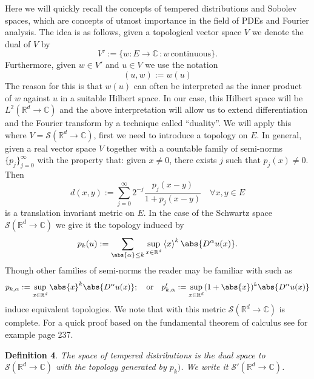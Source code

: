 \documentclass[
]{article}
\begin{document}
Here we will quickly recall the concepts of tempered distributions and
Sobolev spaces, which are concepts of utmost importance in the field of
PDEs and Fourier analysis. The idea is as follows, given a topological
vector space \(V\) we denote the dual of \(V\) by
\[V':=\lbrace w:E\to\mathbb{C}\hspace{2pt}: w \hspace{2pt}\text{continuous}\rbrace.\]
Furthermore, given \(w\in V'\) and \(u\in V\) we use the notation
\[(u,w):=w(u)\] The reason for this is that \(w(u)\) can often be
interpreted as the inner product of \(w\) against \(u\) in a suitable
Hilbert space. In our case, this Hilbert space will be
\(L^2({\mathbb R}^d\to\mathbb{C})\) and the above interpretation will
allow us to extend differentiation and the Fourier transform by a
technique called ``duality''. We will apply this where
\(V={\mathcal S}({\mathbb R}^d\to\mathbb{C})\), first we need to
introduce a topology on \(E\). In general, given a real vector space
\(V\) together with a countable family of semi-norms
\(\lbrace p_j\rbrace_{j=0}^\infty\) with the property that: given
\(x\neq 0\), there exists \(j\) such that \(p_j(x)\neq 0\). Then
\[\label{seminormsgivemetric}
	d(x,y):=\sum_{j=0}^\infty 2^{-j}\frac{p_j(x-y)}{1+p_j(x-y)}\quad \forall{x,y}\in {E}\]
is a translation invariant metric on \(E\). In the case of the Schwartz
space \({\mathcal S}({\mathbb R}^d\to\mathbb{C})\) we give it the
topology induced by \[\label{seminornormsSchwartz}
	p_k(u):=\sum_{\abs{\alpha}\leq k} \sup_{x\in{\mathbb R}^d}\left\langle x\right\rangle^k \abs{D^\alpha u(x)}.\]
Though other families of semi-norms the reader may be familiar with such
as
\[p_{k,\alpha}:=\sup_{x\in{\mathbb R}^d}\abs{x}^k \abs{D^\alpha u(x)};\quad\text{or}\quad p'_{k,\alpha}:=\sup_{x\in{\mathbb R}^d}(1+\abs{x})^k \abs{D^\alpha u(x)}\]
induce equivalent topologies. We note that with this metric
\({\mathcal S}({\mathbb R}^d\to\mathbb{C})\) is complete. For a quick
proof based on the fundamental theorem of calculus see for example
\cite{Foll} page 237.

\textbf{Definition 4}. \emph{The space of \emph{tempered distributions}
	is the dual space to \({\mathcal S}({\mathbb R}^d\to\mathbb{C})\) with
	the topology generated by \(p_k)\). We write it
	\({\mathcal S}'({\mathbb R}^d\to\mathbb{C})\).}
\end{document}
